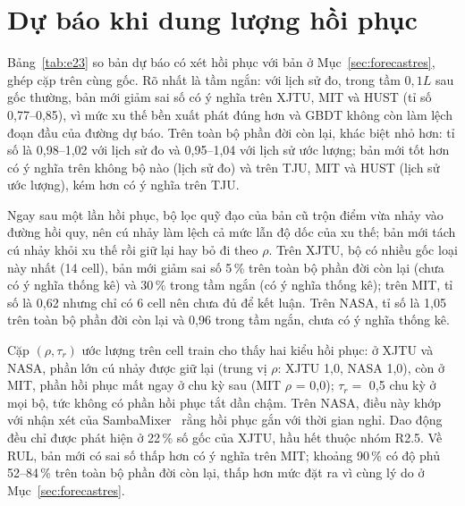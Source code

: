 \documentclass[12pt,a4paper,oneside]{report}
\theoremstyle{plain}
\theoremstyle{definition}
\begin{document}
\section{Dự báo khi dung lượng hồi phục}\label{sec:recoveryres}

Bảng~\ref{tab:e23} so bản dự báo có xét hồi phục với bản ở Mục~\ref{sec:forecastres}, ghép cặp trên cùng gốc. Rõ nhất là
tầm ngắn: với lịch sử đo, trong tầm $0{,}1L$ sau gốc thường, bản mới giảm sai số có ý nghĩa trên XJTU, MIT và HUST (tỉ số 0{,}77--0{,}85), vì
mức xu thế bền xuất phát đúng hơn và GBDT không còn làm lệch đoạn đầu của đường dự báo. Trên toàn bộ phần đời còn lại,
khác biệt nhỏ hơn: tỉ số là 0{,}98--1{,}02 với lịch sử đo và 0{,}95--1{,}04 với lịch sử ước lượng; bản mới tốt hơn có ý nghĩa trên không bộ nào
(lịch sử đo) và trên TJU, MIT và HUST (lịch sử ước lượng), kém hơn có ý nghĩa trên TJU.

Ngay sau một lần hồi phục, bộ lọc quỹ đạo của bản cũ trộn điểm vừa nhảy vào đường hồi quy, nên cú nhảy làm lệch cả mức
lẫn độ dốc của xu thế; bản mới tách cú nhảy khỏi xu thế rồi giữ lại hay bỏ đi theo $\rho$. Trên XJTU, bộ có nhiều gốc
loại này nhất (14 cell), bản mới giảm sai số 5\,\% trên toàn bộ phần đời còn lại (chưa có ý nghĩa thống kê) và 30\,\% trong tầm
ngắn (có ý nghĩa thống kê); trên MIT, tỉ số là 0{,}62 nhưng chỉ có 6 cell nên chưa đủ để kết luận. Trên NASA, tỉ số là 1{,}05
trên toàn bộ phần đời còn lại và 0{,}96 trong tầm ngắn, chưa có ý nghĩa thống kê.

Cặp $(\rho, \tau_r)$ ước lượng trên cell train cho thấy hai kiểu hồi phục: ở XJTU và NASA, phần lớn cú nhảy được giữ lại
(trung vị $\rho$: XJTU 1{,}0, NASA 1{,}0), còn ở MIT, phần hồi phục mất ngay ở chu kỳ sau (MIT $\rho$ = 0{,}0); $\tau_r = $ 0{,}5 chu kỳ
ở mọi bộ, tức không có phần hồi phục tắt dần chậm. Trên NASA, điều này khớp với nhận xét của
SambaMixer~\cite{olalde2024samba} rằng hồi phục gắn với thời gian nghỉ. Dao động đều chỉ được phát hiện ở 22\,\% số gốc
của XJTU, hầu hết thuộc nhóm R2.5. Về RUL, bản mới có sai số thấp hơn có ý nghĩa trên MIT; khoảng 90\,\% có độ phủ 52--84\,\% trên toàn bộ phần đời còn
lại, thấp hơn mức đặt ra vì cùng lý do ở Mục~\ref{sec:forecastres}.
\end{document}
